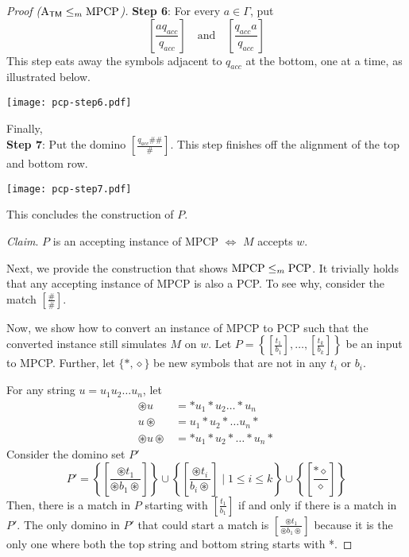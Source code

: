 \begin{proof}[Proof \hspace{0.1em} ($\mathrm{A}_{\mathsf{TM}} \leq_m \mathrm{MPCP}$)]
    \textbf{Step 6}: For every $a \in \Gamma$, put
    $$
    \left[ \frac{a q_{acc}}{q_{acc}} \right]  \quad \text{and} \quad \left[ \frac{q_{acc} a}{q_{acc}} \right]
    $$
    This step eats away the symbols adjacent to $q_{acc}$ at the bottom, one at a time, as illustrated below.
    \begin{center}
        \texttt{[image: pcp-step6.pdf]}
    \end{center}

    Finally, \\
    \textbf{Step 7}: Put the domino $\displaystyle \left[ \frac{q_{acc} \#\#}{\#} \right]$. This step finishes off the alignment of the top and bottom row.
    \begin{center}
        \texttt{[image: pcp-step7.pdf]}
    \end{center}

    This concludes the construction of $P$.

    \textit{Claim}. $P$ is an accepting instance of MPCP $\iff$ $M$ accepts $w$. 

    \hfill

    Next, we provide the construction that shows $\mathrm{MPCP} \leq_m \mathrm{PCP}$. It trivially holds that any accepting instance of MPCP is also a PCP. To see why, consider the match $\left[ \frac{\#}{\#} \right]$.

    Now, we show how to convert an instance of MPCP to PCP such that the converted instance still simulates $M$ on $w$. Let $\displaystyle P = \left\{ \left[ \frac{t_1}{b_1} \right], \ldots, \left[ \frac{t_k}{b_k} \right] \right\}$ be an input to MPCP. Further, let $\{*, \diamond\}$ be new symbols that are not in any $t_i$ or $b_i$.

    For any string $u = u_1u_2\ldots u_n$, let
    $$
    \begin{aligned}
        \circledast u &= * u_1 * u_2 \ldots * u_n \\
        u \circledast &= u_1 * u_2 * \ldots u_n * \\
        \circledast u \circledast &= * u_1 * u_2 * \ldots * u_n *
    \end{aligned}
    $$
    Consider the domino set $P'$ 
    $$
    P' = \left\{ \left[ \frac{\circledast t_1}{\circledast b_1 \circledast} \right]  \right\} \cup \left\{ \left[ \frac{\circledast t_i}{ b_i \circledast} \right]  \mid 1 \leq i \leq k \right\} \cup \left\{ \left[ \frac{* \diamond}{\diamond} \right]  \right\}
    $$
    Then, there is a match in $P$ starting with $\left[ \frac{t_1}{b_1} \right] $ if and only if there is a match in $P'$. The only domino in $P'$ that could start a match is $\left[ \frac{\circledast t_1}{\circledast b_1 \circledast} \right]$ because it is the only one where both the top string and bottom string starts with *.
\end{proof}